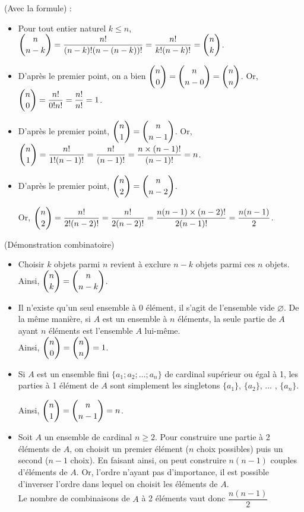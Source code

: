 \documentclass[11pt,fleqn, openany]{book} %
\begin{document}
\begin{demonstration} (Avec la formule) :
\begin{itemize}
\item Pour tout entier naturel $k\leqslant n$, $\dbinom{n}{n-k}=\dfrac{n!}{(n-k)!(n-(n-k))!}=\dfrac{n!}{k!(n-k)!}=\dbinom{n}{k}$.
\item D'après le premier point, on a bien $\dbinom{n}{0}=\dbinom{n}{n-0}=\dbinom{n}{n}$. Or, $\dbinom{n}{0}=\dfrac{n!}{0!n!}=\dfrac{n!}{n!}=1$.
\item D'après le premier point,  $\dbinom{n}{1}=\dbinom{n}{n-1}$. Or, $\dbinom{n}{1}=\dfrac{n!}{1!(n-1)!}=\dfrac{n!}{(n-1)!}=\dfrac{n \times (n-1)!}{(n-1)!}=n$.
\item D'après le premier point,  $\dbinom{n}{2}=\dbinom{n}{n-2}$.

 Or, $\dbinom{n}{2}=\dfrac{n!}{2!(n-2)!}=\dfrac{n!}{2(n-2)!}=\dfrac{n(n-1) \times (n-2)!}{2(n-1)!}=\dfrac{n(n-1)}{2}$.
\end{itemize}\end{demonstration}






\begin{demonstration} (Démonstration combinatoire)

\begin{itemize}
\item Choisir $k$ objets parmi $n$ revient à exclure $n-k$ objets parmi ces $n$ objets. Ainsi, $\dbinom{n}{k}=\dbinom{n}{n-k}$.
\item Il n'existe qu'un seul ensemble à 0 élément, il s'agit de l'ensemble vide $\varnothing$. De la même manière, si $A$ est un ensemble à $n$ éléments, la seule partie de $A$ ayant $n$ éléments est l'ensemble $A$ lui-même.\\  Ainsi, $\dbinom{n}{0}=\dbinom{n}{n}=1$.
\item Si $A$ est un ensemble fini $\{a_1;a_2;\ldots ;a_n\}$ de cardinal supérieur ou égal à 1, les parties à 1 élément de $A$ sont simplement les singletons $\{ a_1\}$, $\{a_2\}$, ... , $\{a_n\}$. 

Ainsi, $\dbinom{n}{1}=\dbinom{n}{n-1}=n$.
\item Soit $A$ un ensemble de cardinal $n\geqslant 2$. Pour construire une partie à 2 éléments de $A$, on choisit un premier élément ($n$ choix possibles) puis un second ($n-1$ choix). En faisant ainsi, on peut construire $n(n-1)$ couples d'éléments de $A$. Or, l'ordre n'ayant pas d'importance, il est possible d'inverser l'ordre dans lequel on choisit les éléments de $A$. \\ Le nombre de combinaisons de $A$ à 2 éléments vaut donc $\dfrac{n(n-1)}{2}$
\end{itemize}\end{demonstration}
\end{document}
